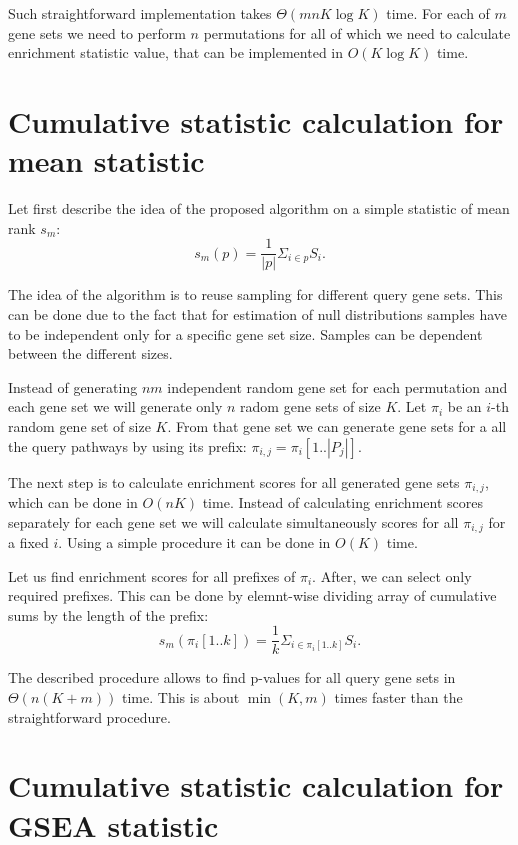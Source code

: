 \documentclass[runningheads,a4paper]{llncs}
\begin{document}
Such straightforward implementation takes $\Theta(mnK \log K)$ time.
For each of $m$ gene sets we need to perform $n$ permutations for all
of which we need to calculate enrichment statistic value, that
can be implemented in $O(K \log K)$ time.

\section{Cumulative statistic calculation for mean statistic}\label{section_mean}

Let first describe the idea of the proposed algorithm on a simple statistic
of mean rank $s_m$:
\[
    s_m(p) = \frac{1}{|p|} \Sigma_{i \in p} S_i.
\]

The idea of the algorithm is to reuse sampling for different query gene sets.
This can be done due to the fact that for estimation of null distributions
samples have to be independent only for a specific gene set size.
Samples can be dependent between the different sizes.

Instead of generating $nm$ independent random gene set for each
permutation and each gene set we will generate only $n$ radom
gene sets of size $K$. Let $\pi_i$ be an $i$-th random gene set of 
size $K$. From that gene set we can generate gene sets
for a all the query pathways by using its prefix: $\pi_{i,j}=
\pi_i[1..|P_j|]$.

The next step is to calculate enrichment scores for all generated
gene sets $\pi_{i,j}$, which can be done in $O(nK)$ time. Instead of 
calculating enrichment scores separately for each gene set
we will calculate simultaneously scores for all $\pi_{i,j}$ for a fixed
$i$. Using a simple procedure it can be done in $O(K)$ time.

Let us find enrichment scores for all prefixes of $\pi_i$. After, we
can select only required prefixes. This
can be done by elemnt-wise dividing array of cumulative sums 
by the length of the prefix:
\[
    s_m(\pi_i[1..k]) = \frac{1}{k} \Sigma_{i \in \pi_i[1..k]} S_i.
\]

The described procedure allows to find p-values
for all query gene sets in $\Theta(n(K+m))$ time.
This is about $\min(K, m)$ times faster than the straightforward procedure.

\section{Cumulative statistic calculation for GSEA statistic}\label{section_gsea}
\end{document}
